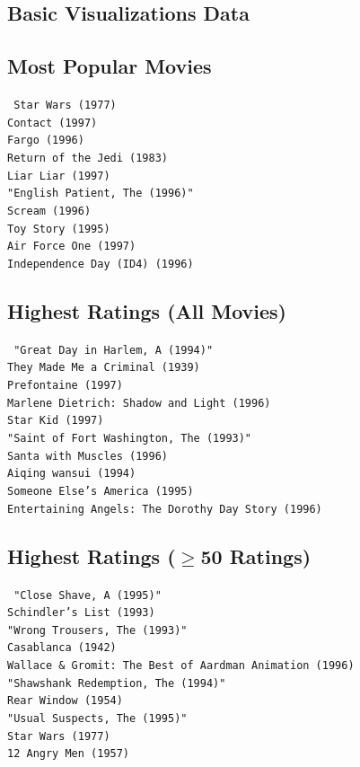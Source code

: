 \pagebreak
\begin{appendices}

\section{Basic Visualizations Data}

\subsection{Most Popular Movies}
\label{appendix:popular}
\texttt{%
  Star Wars (1977) \\
  Contact (1997) \\
  Fargo (1996) \\
  Return of the Jedi (1983) \\
  Liar Liar (1997) \\
  "English Patient, The (1996)" \\
  Scream (1996) \\
  Toy Story (1995) \\
  Air Force One (1997) \\
  Independence Day (ID4)  (1996)
}

\subsection{Highest Ratings (All Movies)}
\label{appendix:highest}
\texttt{%
  "Great Day in Harlem, A (1994)" \\
  They Made Me a Criminal (1939) \\
  Prefontaine (1997) \\
  Marlene Dietrich: Shadow and Light (1996) \\
  Star Kid (1997) \\
  "Saint of Fort Washington, The (1993)" \\
  Santa with Muscles (1996) \\
  Aiqing wansui (1994) \\
  Someone Else's America (1995) \\
  Entertaining Angels: The Dorothy Day Story (1996)
}

\subsection{Highest Ratings (\texorpdfstring{$\geq$}\ 50 Ratings)}
\label{appendix:highestpruned}
\texttt{%
  "Close Shave, A (1995)" \\
  Schindler's List (1993) \\
  "Wrong Trousers, The (1993)" \\
  Casablanca (1942) \\
  Wallace \& Gromit: The Best of Aardman Animation (1996) \\
  "Shawshank Redemption, The (1994)" \\
  Rear Window (1954) \\
  "Usual Suspects, The (1995)" \\
  Star Wars (1977) \\
  12 Angry Men (1957)
}


\end{appendices}
